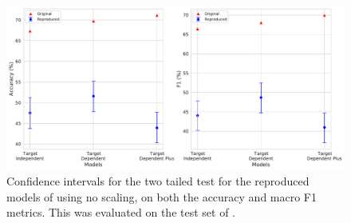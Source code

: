 \begin{figure}[!h]
    \centering
    \includegraphics[scale=0.37]{images/reproducibility/vo/Target_Non_Scaled_Reproduction_Dong.pdf}
    \caption{Confidence intervals for the two tailed test for the reproduced models of \citet{vo2015target} using no scaling, on both the accuracy and macro F1 metrics. This was evaluated on the test set of \citet{dong-etal-2014-adaptive}.}
    \label{fig:repro_vo_Target_Non_Scaled_Reproduction_Dong}
\end{figure}

